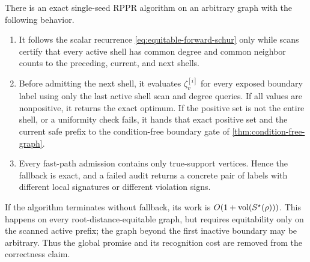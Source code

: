 \begin{theorem}
\label{thm:certifying-shell-fast-path}
There is an exact single-seed RPPR algorithm on an arbitrary graph with the
following behavior.
\begin{enumerate}[label=(\roman*),leftmargin=*]
 \item It follows the scalar recurrence
 \cref{eq:equitable-forward-schur} only while scans certify that every active
 shell has common degree and common neighbor counts to the preceding, current,
 and next shells.
 \item Before admitting the next shell, it evaluates
 $\zeta_v^{[i]}$ for every exposed boundary label using only the last active
 shell scan and degree queries.  If all values are nonpositive, it returns the
 exact optimum.  If the positive set is not the entire shell, or a uniformity
 check fails, it hands that exact positive set and the current safe prefix to
 the condition-free boundary gate of
 \cref{thm:condition-free-graph}.
 \item Every fast-path admission contains only true-support vertices.  Hence
 the fallback is exact, and a failed audit returns a concrete pair of labels
 with different local signatures or different violation signs.
\end{enumerate}
If the algorithm terminates without fallback, its work is
$O(1+\operatorname{vol}(S^\star(\rho)))$.  This happens on every root-distance-equitable
graph, but requires equitability only on the scanned active prefix; the graph
beyond the first inactive boundary may be arbitrary.  Thus the global promise
and its recognition cost are removed from the correctness claim.
\end{theorem}

